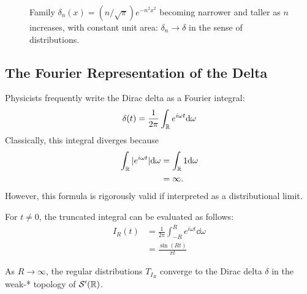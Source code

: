 \begin{figure}[!htbp]
\centering
{}
\caption[Delta-converging sequence]{Family $\delta_n(x) = (n/\sqrt{\pi})e^{-n^2x^2}$
becoming narrower and taller as $n$ increases, with constant unit area:
$\delta_n \to \delta$ in the sense of distributions.}
\label{fig:ch13-delta-sequence}
\end{figure}

\subsection{The Fourier Representation of the Delta}

Physicists frequently write the Dirac delta as a Fourier integral:
\begin{equation}
\delta(t) = \frac{1}{2\pi} \int_{\mathbb{R}} e^{i\omega t} \mathrm{d} \omega
\end{equation}
Classically, this integral diverges because
\[
\begin{aligned}
\int_{\mathbb{R}} |e^{i\omega t}| \mathrm{d} \omega &= \int_{\mathbb{R}} 1 \mathrm{d} \omega \\
&= \infty.
\end{aligned}
\]
However, this formula is rigorously valid if interpreted as a distributional limit.

\begin{proposition}
For $t \neq 0$, the truncated integral can be evaluated as follows:
\[
\begin{aligned}
I_R(t) &= \frac{1}{2\pi} \int_{-R}^R e^{i\omega t} \dd \omega \\
&= \frac{\sin(Rt)}{\pi t}
\end{aligned}
\]

As $R \to \infty$, the regular distributions $T_{I_R}$ converge to the Dirac delta $\delta$ in the weak-* topology of $\mathcal{S}'(\mathbb{R})$.
\end{proposition}

